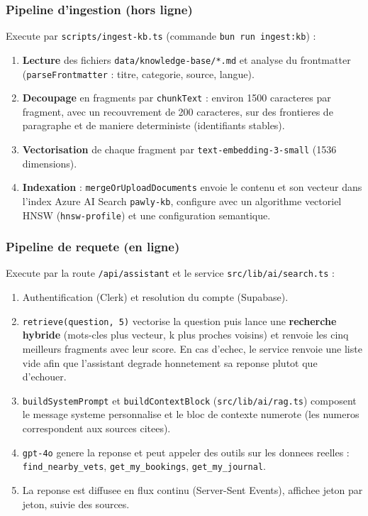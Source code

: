 \documentclass[11pt,a4paper]{article}
\begin{document}
\subsubsection{Pipeline d'ingestion (hors ligne)}
Execute par \texttt{scripts/ingest-kb.ts} (commande \texttt{bun run ingest:kb}) :
\begin{enumerate}[leftmargin=1.6em]
  \item \textbf{Lecture} des fichiers \texttt{data/knowledge-base/*.md} et analyse du frontmatter (\texttt{parseFrontmatter} : titre, categorie, source, langue).
  \item \textbf{Decoupage} en fragments par \texttt{chunkText} : environ 1500 caracteres par fragment, avec un recouvrement de 200 caracteres, sur des frontieres de paragraphe et de maniere deterministe (identifiants stables).
  \item \textbf{Vectorisation} de chaque fragment par \texttt{text-embedding-3-small} (1536 dimensions).
  \item \textbf{Indexation} : \texttt{mergeOrUploadDocuments} envoie le contenu et son vecteur dans l'index Azure AI Search \texttt{pawly-kb}, configure avec un algorithme vectoriel HNSW (\texttt{hnsw-profile}) et une configuration semantique.
\end{enumerate}

\subsubsection{Pipeline de requete (en ligne)}
Execute par la route \texttt{/api/assistant} et le service \texttt{src/lib/ai/search.ts} :
\begin{enumerate}[leftmargin=1.6em]
  \item Authentification (Clerk) et resolution du compte (Supabase).
  \item \texttt{retrieve(question, 5)} vectorise la question puis lance une \textbf{recherche hybride} (mots-cles plus vecteur, k plus proches voisins) et renvoie les cinq meilleurs fragments avec leur score. En cas d'echec, le service renvoie une liste vide afin que l'assistant degrade honnetement sa reponse plutot que d'echouer.
  \item \texttt{buildSystemPrompt} et \texttt{buildContextBlock} (\texttt{src/lib/ai/rag.ts}) composent le message systeme personnalise et le bloc de contexte numerote (les numeros correspondent aux sources citees).
  \item \texttt{gpt-4o} genere la reponse et peut appeler des outils sur les donnees reelles : \texttt{find\_nearby\_vets}, \texttt{get\_my\_bookings}, \texttt{get\_my\_journal}.
  \item La reponse est diffusee en flux continu (Server-Sent Events), affichee jeton par jeton, suivie des sources.
\end{enumerate}
\end{document}
